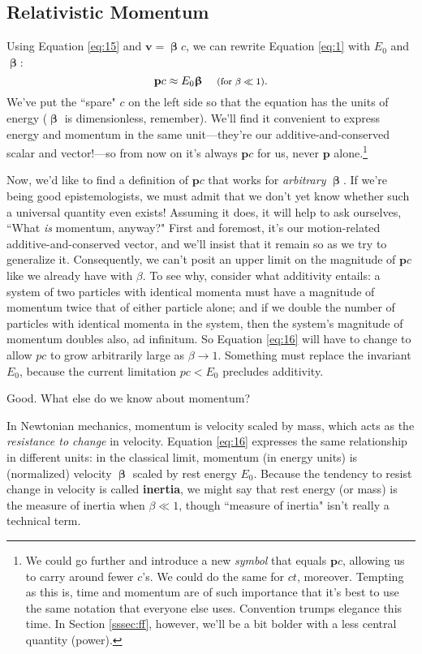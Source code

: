 \documentclass[12pt]{article}
\renewcommand{\vv}[1]{\mathbf{#1}}
\newcommand{\vvbeta}{\bm{\upbeta}}
\begin{document}
\subsection{Relativistic Momentum}\label{ssec:rm}

Using Equation \ref{eq:15} and $\vv v = \vvbeta c$, we can rewrite Equation \ref{eq:1} with $E_0$ and $\vvbeta$:
\begin{equation}\label{eq:16}
\vv p c \approx E_0 \vvbeta \quad \textrm{\footnotesize{ (for $\beta \ll 1$)}}.
\end{equation}
We've put the ``spare" $c$ on the left side so that the equation has the units of energy ($\vvbeta$ is dimensionless, remember). We'll find it convenient to express energy and momentum in the same unit---they're our additive-and-conserved scalar and vector!---so from now on it's always $\vv p c$ for us, never $\vv p$ alone.\footnote{We could go further and introduce a new \emph{symbol} that equals $\vv p c$, allowing us to carry around fewer $c$'s. We could do the same for $ct$, moreover. Tempting as this is, time and momentum are of such importance that it's best to use the same notation that everyone else uses. Convention trumps elegance this time. In Section \ref{sssec:ff}, however, we'll be a bit bolder with a less central quantity (power).}

Now, we'd like to find a definition of $\vv p c$ that works for \emph{arbitrary} $\vvbeta$. If we're being good epistemologists, we must admit that we don't yet know whether such a universal quantity even exists! Assuming it does, it will help to ask ourselves, ``What \emph{is} momentum, anyway?" First and foremost, it's our motion-related additive-and-conserved vector, and we'll insist that it remain so as we try to generalize it. Consequently, we can't posit an upper limit on the magnitude of $\vv p c$ like we already have with $\beta$. To see why, consider what additivity entails: a system of two particles with identical momenta must have a magnitude of momentum twice that of either particle alone; and if we double the number of particles with identical momenta in the system, then the system's magnitude of momentum doubles also, ad infinitum. So Equation \ref{eq:16} will have to change to allow $p c$ to grow arbitrarily large as $\beta \rightarrow 1$. Something must replace the invariant $E_0$, because the current limitation $pc < E_0$ precludes additivity.

Good. What else do we know about momentum?

In Newtonian mechanics, momentum is velocity scaled by mass, which acts as the \emph{resistance to change} in velocity. Equation \ref{eq:16} expresses the same relationship in different units: in the classical limit, momentum (in energy units) is (normalized) velocity $\vvbeta$ scaled by rest energy $E_0$. Because the tendency to resist change in velocity is called \textbf{inertia}, we might say that rest energy (or mass) is the measure of inertia when $\beta \ll 1$, though ``measure of inertia" isn't really a technical term.
\end{document}

